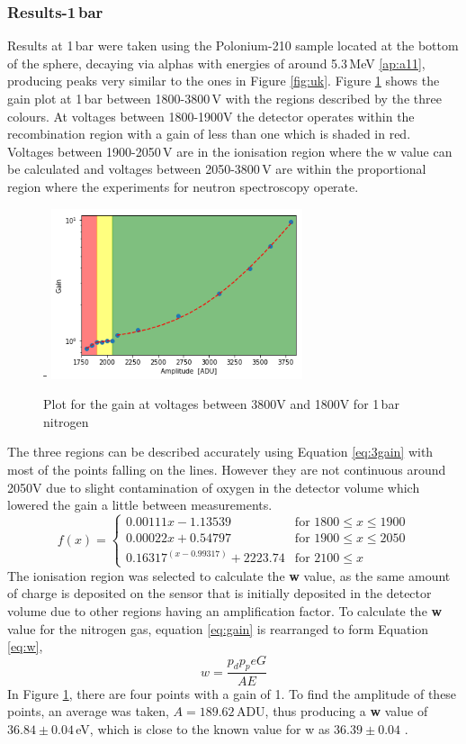 \documentclass[a4paper]{article}
\begin{document}
\subsubsection{Results-1\,bar}
Results at 1\,bar were taken using the Polonium-210 sample located at the bottom of the sphere, decaying via alphas with energies of around 5.3\,MeV \ref{ap:a11}, producing peaks very similar to the ones in Figure \ref{fig:uk}. Figure \ref{fig:gain2} shows the gain plot at 1\,bar between 1800-3800\,V with the regions described by the three colours. At voltages between 1800-1900V the detector operates within the recombination region with a gain of less than one which is shaded in red. Voltages between 1900-2050\,V are in the ionisation region where the w value can be calculated and voltages between 2050-3800\,V are within the proportional region where the experiments for neutron spectroscopy operate.
\begin{figure}[H]-
    \centering
    \includegraphics[height=5cm]{plots/1bargainfit.png}
    \caption{Plot for the gain at voltages between 3800V and 1800V for 1\,bar nitrogen}
    \label{fig:gain2}
\end{figure}
\noindent The three regions can be described accurately using Equation \ref{eq:3gain} with most of the points falling on the lines. However they are not continuous around 2050V due to slight contamination of oxygen in the detector volume which lowered the gain a little between measurements.
\begin{equation}
f(x) = \begin{cases} 0.00111x-1.13539 &\mbox{for } 1800 \leq x  \leq 1900 \\
0.00022x+0.54797 & \mbox{for } 1900\leq x \leq 2050 \\
0.16317^{(x-0.99317)}+2223.74 & \mbox{for }  2100 \leq x
\end{cases}
\label{eq:3gain}
\end{equation}
 The ionisation region was selected to calculate the \textbf{w} value, as the same amount of charge is deposited on the sensor that is initially deposited in the detector volume due to other regions having an amplification factor. To calculate the \textbf{w} value for the nitrogen gas, equation \ref{eq:gain} is rearranged to form Equation \ref{eq:w},
\begin{equation}
    w = \frac{p_dp_peG}{AE}
    \label{eq:w}
\end{equation}
\noindent In Figure \ref{fig:gain2}, there are four points with a gain of 1. To find the amplitude of these points, an average was taken, $A=189.62$\,ADU, thus producing a \textbf{w} value of $36.84 \pm 0.04$\,eV, which is close to the known value for w as $36.39 \pm 0.04$ \cite{Krieger_1979}. 
\end{document}

